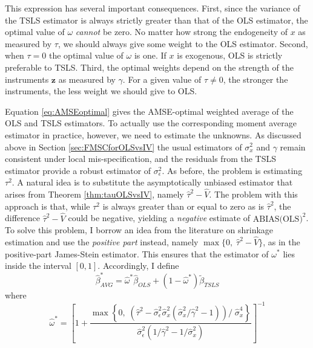 This expression has several important consequences. 
First, since the variance of the TSLS estimator is always strictly greater than that of the OLS estimator, the optimal value of $\omega$ \emph{cannot} be zero. 
No matter how strong the endogeneity of $x$ as measured by $\tau$, we should always give some weight to the OLS estimator. 
Second, when $\tau = 0$ the optimal value of $\omega$ is one. If $x$ is exogenous, OLS is strictly preferable to TSLS. 
Third, the optimal weights depend on the strength of the instruments $\mathbf{z}$ as measured by $\gamma$. 
For a given value of $\tau\neq 0$, the stronger the instruments, the less weight we should give to OLS.

Equation \ref{eq:AMSEoptimal} gives the AMSE-optimal weighted average of the OLS and TSLS estimators. 
To actually use the corresponding moment average estimator in practice, however, we need to estimate the unknowns.
As discussed above in Section \ref{sec:FMSCforOLSvsIV} the usual estimators of $\sigma_x^2$ and $\gamma$ remain consistent under local mis-specification, and the residuals from the TSLS estimator provide a robust estimator of $\sigma_\epsilon^2$.
As before, the problem is estimating $\tau^2$.
A natural idea is to substitute the asymptotically unbiased estimator that arises from Theorem \ref{thm:tauOLSvsIV}, namely $\widehat{\tau}^2 - \widehat{V}$. 
The problem with this approach is that, while $\tau^2$ is always greater than or equal to zero as is $\widehat{\tau}^2$, the difference $\widehat{\tau}^2 - \widehat{V}$ could be negative, yielding a \emph{negative} estimate of $\mbox{ABIAS(OLS)}^2$.
To solve this problem, I borrow an idea from the literature on shrinkage estimation and use the \emph{positive part} instead, namely $\max\{0, \; \widehat{\tau}^2 - \widehat{V}\}$, as in the positive-part James-Stein estimator.
This ensures that the estimator of $\omega^*$ lies inside the interval $[0,1]$.
Accordingly, I define 
\begin{equation}
	\widehat{\beta}^*_{AVG} = \widehat{\omega}^* \widehat{\beta}_{OLS} + (1 - \widehat{\omega}^*)\widetilde{\beta}_{TSLS}
	\label{eq:OLSvsIV_AVG1}
\end{equation}
where
\begin{equation}
\widehat{\omega }^* = \left[1 + \frac{\max \left\{0, \; \left(\widehat{\tau}^2 - \widehat{\sigma}_\epsilon^2\widehat{\sigma}_x^2  \left(\widehat{\sigma}_x^2/\widehat{\gamma}^2 - 1 \right) \right)/\;\widehat{\sigma}_x^4 \right\}}{\widehat{\sigma}_\epsilon^2 (1/\widehat{\gamma}^2 - 1/\widehat{\sigma}_x^2)}\right]^{-1}
	\label{eq:OLSvsIV_AVG2}
\end{equation}

